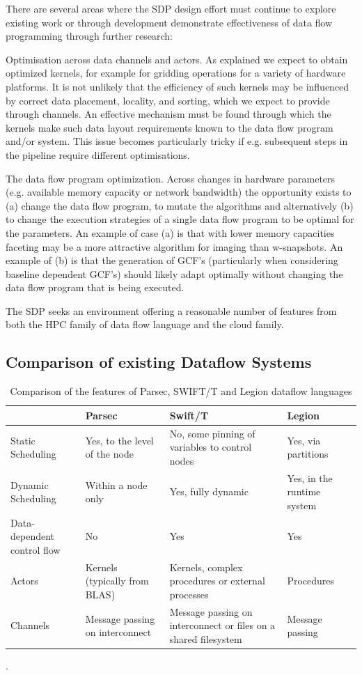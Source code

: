 \documentclass[11pt,a4paper]{article}
\begin{document}
There are several areas where the SDP design effort must continue to
explore existing work or through development demonstrate effectiveness
of data flow programming through further research:

Optimisation across data channels and actors.  As explained we expect
to obtain optimized kernels, for example for gridding operations for a
variety of hardware platforms.  It is not unlikely that the efficiency
of such kernels may be influenced by correct data placement, locality,
and sorting, which we expect to provide through channels.  An
effective mechanism must be found through which the kernels make such
data layout requirements known to the data flow program and/or
system. This issue becomes particularly tricky if e.g. subsequent
steps in the pipeline require different optimisations.

The data flow program optimization.  Across changes in hardware
parameters (e.g. available memory capacity or network bandwidth) the
opportunity exists to (a) change the data flow program, to mutate the
algorithms and alternatively (b) to change the execution strategies of
a single data flow program to be optimal for the parameters.  An
example of case (a) is that with lower memory capacities faceting may
be a more attractive algorithm for imaging than w-snapshots.  An
example of (b) is that the generation of GCF’s (particularly when
considering baseline dependent GCF’s) should likely adapt optimally
without changing the data flow program that is being executed.

The SDP seeks an environment offering a reasonable number of features
from both the HPC family of data flow language and the cloud family.

\subsection{Comparison of  existing Dataflow Systems}

\begin{table}[h]
\centering
\begin{tabular}{|p{}|p{}|p{}|p{}|}
 \hline
& Parsec & Swift/T & Legion\\\hline
Static Scheduling &
Yes, to the level of the node &
No, some pinning of variables to control nodes  &
Yes, via partitions
\\\hline
Dynamic Scheduling &
Within a node only&
Yes, fully dynamic&
Yes, in the runtime system\\\hline
Data-dependent control flow &
No & Yes & Yes \\\hline
Actors & Kernels (typically from BLAS) & Kernels, complex procedures or external processes & Procedures \\\hline
Channels &
Message passing on interconnect &
Message passing on interconnect or files on a shared filesystem & Message passing \\\hline
\end{tabular}
\caption{Comparison of the features of Parsec, SWIFT/T and Legion dataflow languages}.
\end{table}
\end{document}
